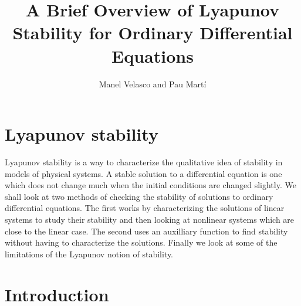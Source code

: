 \documentclass[nols]{tufte-handout}
\title{A Brief Overview of Lyapunov Stability for Ordinary Differential Equations} %
\author[Manel Velasco and Pau Martí]{Manel Velasco and Pau Martí} %
\theoremstyle{definition}
\newcommand{\chapter}[1]{\section{#1}}
\begin{document}
\maketitle
\setcounter{secnumdepth}{2}

\else

\fi











\def\Def{Definition}
\def\a{for every }
\def\A{For every }
\def\e{there exists }
\def\E{There exists }
\def\pf{{\em Proof. }}
\def\eps{\varepsilon}
\def\bx{\bar{x}}
\def\by{\bar{y}}
\def\vphi{\varphi}



\newtheorem{dfn}{Definition}[section]
\newtheorem{eqn}{Equation}[section]
\newtheorem{lem}{Lemma}[section]
\newtheorem{thm}{Theorem}[section]
\newtheorem{cor}{Corollary}[section]


\chapter{Lyapunov stability}
Lyapunov stability is a way to characterize the qualitative
idea of stability in models of physical systems.  A stable solution to
a differential equation is one which does not change much when the
initial conditions are changed slightly.  We shall look at two methods
of checking the stability of solutions to ordinary differential
equations.  The first works by characterizing the solutions of linear
systems to study their stability and then looking at nonlinear systems
which are close to the linear case.  The second uses an auxilliary
function to find stability without having to characterize the
solutions.  Finally we look at some of the limitations of the Lyapunov
notion of stability.

\section{Introduction}
\end{document}
